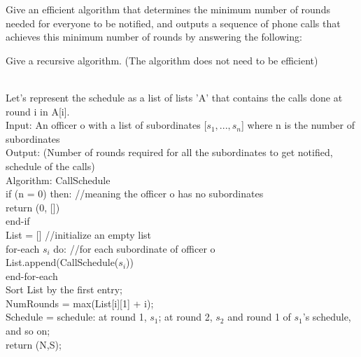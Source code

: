 \documentclass[solutionorbox,answers]{exam}
\begin{document}
\begin{questions}
Give an efficient algorithm that determines the minimum number of rounds needed for everyone to be notified, and outputs a sequence of phone calls that achieves this minimum number of rounds by answering the following: 
\begin{parts}
\item Give a recursive algorithm. (The algorithm does not need to be efficient)
\begin{solutionbox}{} \\
Let's represent the schedule as a list of lists 'A' that contains the calls done at round i in A[i]. \\
Input: An officer o with a list of subordinates [$s_{1},...,s_{n}$] where n is the number of subordinates\\
Output: (Number of rounds required for all the subordinates to get notified, schedule of the calls)\\
Algorithm: CallSchedule\\
if (n = 0) then:  //meaning the officer o has no subordinates\\
    return (0, [])\\
end-if\\
List = []  //initialize an empty list\\
for-each $s_{i}$ do:  //for each subordinate of officer o\\
    List.append(CallSchedule($s_{i}$))\\
end-for-each\\
Sort List by the first entry;\\
NumRounds = max(List[i][1] + i);\\
Schedule = schedule: at round 1, $s_{1}$; at round 2, $s_{2}$ and round 1 of $s_{1}$'s schedule, and so on;\\
return (N,S);
\end{solutionbox}


\end{parts}
\end{questions}
\end{document}
